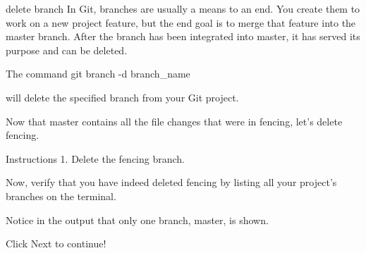 delete branch
    In Git, branches are usually a means to an end. You create them to work on a new project feature, but the end goal is to merge that feature into the master branch. After the branch has been integrated into master, it has served its purpose and can be deleted.

    The command
        git branch -d branch_name
        
    will delete the specified branch from your Git project.

    Now that master contains all the file changes that were in fencing, let’s delete fencing.

Instructions
    1.  
    Delete the fencing branch.

    Now, verify that you have indeed deleted fencing by listing all your project’s branches on the terminal.

    Notice in the output that only one branch, master, is shown.

    Click Next to continue!